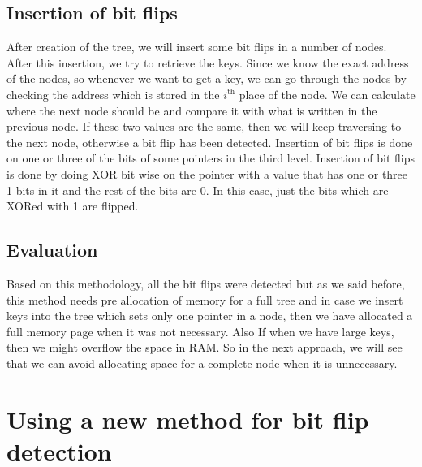 \documentclass[12pt]{report}
\begin{document}
\subsection{Insertion of bit flips}

After creation of the tree, we will insert some bit flips in a number of nodes. After this insertion, we try to retrieve the keys. Since we know the exact address of the nodes, so whenever we want to get a key, we can go through the nodes by checking the address which is stored in the $i^{\text{th}}$ place of the node. We can calculate where the next node should be and compare it with what is written in the previous node. If these two values are the same, then we will keep traversing to the next node, otherwise a bit flip has been detected. Insertion of bit flips is done on one or three of the bits of some pointers in the third level. Insertion of bit flips is done by doing XOR bit wise on the pointer with a value that has one or three 1 bits in it and the rest of the bits are 0. In this case, just the bits which are XORed with 1 are flipped.  

\subsection{Evaluation}  

Based on this methodology, all the bit flips were detected but as we said before, this method needs pre allocation of memory for a full tree and in case we insert keys into the tree which sets only one pointer in a node, then we have allocated a full memory page when it was not necessary. Also If when we have large keys, then we might overflow the space in RAM. So in the next approach, we will see that we can avoid allocating space for a complete node when it is unnecessary.
 
\section{Using a new method for bit flip detection }
\end{document}
